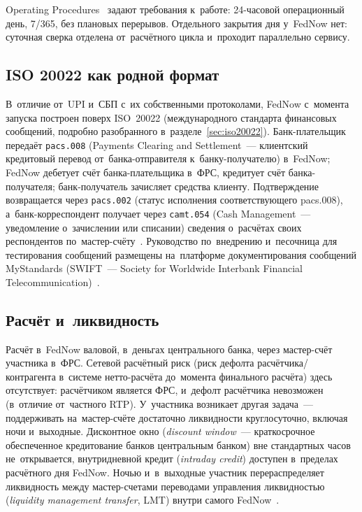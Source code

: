 Operating Procedures~\cite{fednow-op-procedures} задают требования к~работе:
24-часовой операционный день, 7/365, без плановых перерывов. Отдельного
закрытия дня у~FedNow нет: суточная сверка отделена от~расчётного цикла и~проходит
параллельно сервису.

\subsection*{ISO 20022 как родной формат}\label{subsec:fednow-iso20022}

В~отличие от~UPI и~СБП с~их собственными протоколами, FedNow с~момента запуска
построен поверх ISO~20022 (международного стандарта финансовых сообщений,
подробно разобранного в~разделе~\ref{sec:iso20022}). Банк-плательщик передаёт
\texttt{pacs.008} (Payments Clearing and Settlement~--- клиентский кредитовый
перевод от~банка-отправителя к~банку-получателю) в~FedNow; FedNow дебетует счёт
банка-плательщика в~ФРС, кредитует счёт банка-получателя; банк-получатель
зачисляет средства клиенту. Подтверждение возвращается через \texttt{pacs.002}
(статус исполнения соответствующего pacs.008), а~банк-корреспондент получает
через \texttt{camt.054} (Cash Management~--- уведомление о~зачислении или
списании) сведения о~расчётах своих респондентов по~мастер-счёту~\cite{fednow-iso20022}. Руководство по~внедрению и~песочница для тестирования сообщений размещены
на~платформе документирования сообщений MyStandards (SWIFT~--- Society for
Worldwide Interbank Financial Telecommunication)~\cite{fednow-tech-overview}.

\subsection*{Расчёт и~ликвидность}\label{subsec:fednow-settlement}

Расчёт в~FedNow валовой, в~деньгах центрального банка, через мастер-счёт
участника в~ФРС. Сетевой расчётный риск (риск дефолта расчётчика/контрагента
в~системе нетто-расчёта до~момента финального расчёта) здесь отсутствует:
расчётчиком является ФРС, и~дефолт расчётчика невозможен (в~отличие
от~частного RTP). У~участника возникает другая задача~--- поддерживать
на~мастер-счёте достаточно ликвидности круглосуточно, включая ночи и~выходные.
Дисконтное окно (\textit{discount window}~--- краткосрочное обеспеченное
кредитование банков центральным банком) вне стандартных часов не~открывается,
внутридневной кредит (\textit{intraday credit}) доступен в~пределах расчётного
дня FedNow. Ночью и~в~выходные участник перераспределяет ликвидность между
мастер-счетами переводами управления ликвидностью (\textit{liquidity management
transfer}, LMT) внутри самого FedNow~\cite{fednow-liquidity-guide}.


